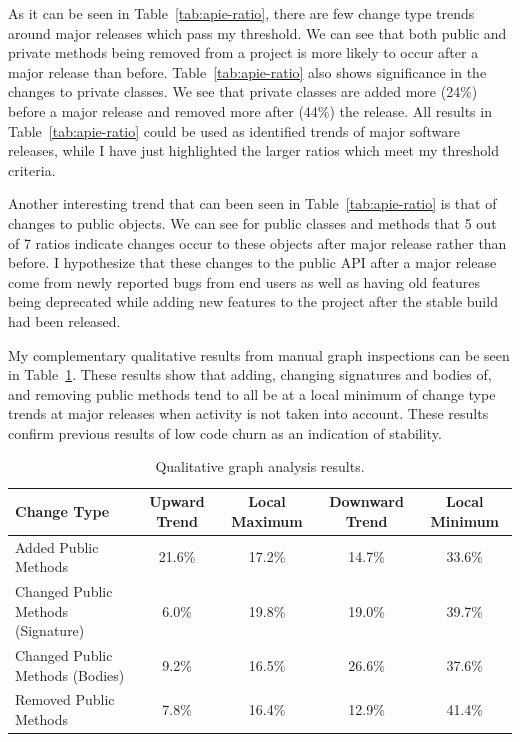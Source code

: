 As it can be seen in Table~\ref{tab:apie-ratio}, there are few change type trends around major releases which pass my threshold. We can see that both public
and private methods
being removed from a project is more likely to occur after a major release than before. Table~\ref{tab:apie-ratio} also shows significance in the changes to private
classes. We see that private classes are added more (24\%) before a major release and removed more after (44\%) the release. 
All results in Table~\ref{tab:apie-ratio} could be used as identified trends of major software releases, while I have just highlighted the larger ratios
which meet my threshold criteria.

Another interesting trend that can been seen in Table~\ref{tab:apie-ratio} is that of changes to public objects. We can see for public classes and methods that
5 out of 7 ratios indicate changes occur to these objects after major release rather than before. I hypothesize that these changes to the public API
after a major release come from newly reported bugs from end users as well as having old features being deprecated while adding new features to the project
after the stable build had been released.

My complementary qualitative results from manual graph inspections can be seen in Table~\ref{tab:qual}. These results show that adding, changing signatures
and bodies of, and removing public methods tend to all be at a local minimum of change type trends at major releases when activity is not taken into
account. These results confirm previous results of low code churn as an indication of stability.

\begin{table}[ht]
\begin{center}
\begin{tabular}{| p{2cm} | c | c | c | c |}
\hline
Change Type & Upward Trend & Local Maximum & Downward Trend & Local Minimum\\
\hline
Added Public Methods & 21.6\% & 17.2\% & 14.7\% & 33.6\% \\ \hline
Changed Public Methods (Signature) & 6.0\% & 19.8\% & 19.0\% & 39.7\% \\ \hline
Changed Public Methods (Bodies) & 9.2\% & 16.5\% & 26.6\% & 37.6\% \\ \hline
Removed Public Methods & 7.8\% & 16.4\% & 12.9\% & 41.4\% \\ \hline
\end{tabular}
\end{center}
\caption{Qualitative graph analysis results. \label{tab:qual}}
\end{table}

